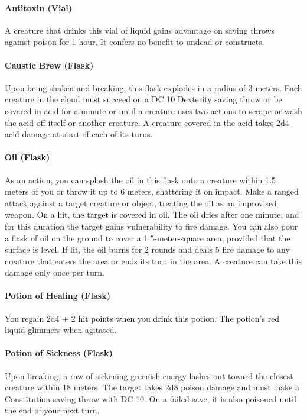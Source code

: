 \paragraph{Antitoxin (Vial)}
    A creature that drinks this vial of liquid gains advantage on saving throws against poison for 1 hour.
    It confers no benefit to undead or constructs.
\paragraph{Caustic Brew (Flask)} %
    Upon being shaken and breaking, this flask explodes in a radius of 3 meters.
    Each creature in the cloud must succeed on a DC 10 Dexterity saving throw or be covered in acid for a minute or until a creature uses two actions to scrape or wash the acid off itself or another creature.
    A creature covered in the acid takes 2d4 acid damage at start of each of its turns.
\paragraph{Oil (Flask)}
    As an action, you can splash the oil in this flask onto a creature within 1.5 meters of you or throw it up to 6 meters, shattering it on impact.
    Make a ranged attack against a target creature or object, treating the oil as an improvised weapon.
    On a hit, the target is covered in oil.
    The oil dries after one minute, and for this duration the target gains vulnerability to fire damage.
    You can also pour a flask of oil on the ground to cover a 1.5-meter-square area, provided that the surface is level.
    If lit, the oil burns for 2 rounds and deals 5 fire damage to any creature that enters the area or ends its turn in the area.
    A creature can take this damage only once per turn.
\paragraph{Potion of Healing (Flask)}
    You regain 2d4 + 2 hit points when you drink this potion.
    The potion's red liquid glimmers when agitated.
\paragraph{Potion of Sickness (Flask)} %
    Upon breaking, a raw of sickening greenish energy lashes out toward the closest creature within 18 meters.
    The target takes 2d8 poison damage and must make a Constitution saving throw with DC 10.
    On a failed save, it is also poisoned until the end of your next turn.

